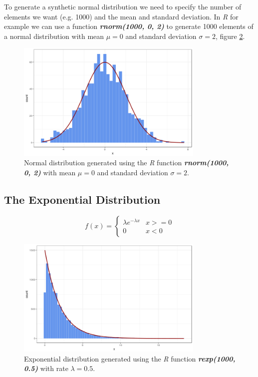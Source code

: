 To generate a synthetic normal distribution we need to specify the number of elements we want (e.g. 1000) and the mean and standard deviation. In \textit{R} for example we can use a function \textbf{\textit{rnorm(1000, 0, 2)}} to generate 1000 elements of a normal distribution with mean $\mu = 0$ and standard deviation $\sigma = 2$, figure \ref{fig:normal_sample}.

\begin{figure}[H]
    \centering
    \includegraphics[width=0.8\textwidth]{img/gld_clustering/extra_images/normal_0_2.png}
    \caption{Normal distribution generated using the \textit{R} function \textbf{\textit{rnorm(1000, 0, 2)}} with mean $\mu = 0$ and standard deviation $\sigma = 2$.}
    \label{fig:normal_sample}
\end{figure}

\subsection{The Exponential Distribution}
\begin{equation}\label{eq:exponential_distribution}
  f(x) =
  \begin{cases}
    \lambda e^{-\lambda x} & \text{$x >= 0 $} \\
    0 & \text{$x < 0$}
  \end{cases}
\end{equation}

\begin{figure}[H]
    \centering
    \includegraphics[width=0.8\textwidth]{img/gld_clustering/extra_images/exp_05.png}
    \caption{Exponential distribution generated using the \textit{R} function \textbf{\textit{rexp(1000, 0.5)}} with rate $\lambda = 0.5$.}
    \label{fig:normal_sample}
\end{figure}

